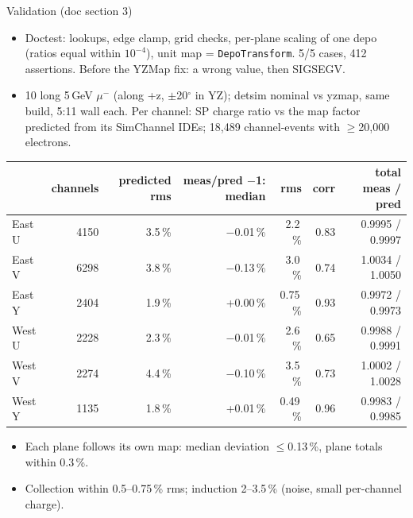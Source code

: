 \documentclass[aspectratio=169,10pt]{beamer}
\newcommand{\code}[1]{\texttt{#1}}
\begin{document}
\begin{frame}{Validation (doc section 3)}
\small
\begin{itemize}
\item Doctest: lookups, edge clamp, grid checks, per-plane scaling of one depo (ratios equal within $10^{-4}$), unit map = \code{DepoTransform}. 5/5 cases, 412 assertions. Before the YZMap fix: a wrong value, then SIGSEGV.
\item 10 long 5\,GeV $\mu^-$ (along +z, $\pm$20$^\circ$ in YZ); detsim nominal vs yzmap, same build, 5:11 wall each. Per channel: SP charge ratio vs the map factor predicted from its SimChannel IDEs; 18,489 channel-events with $\ge$20,000 electrons.
\end{itemize}
\vspace{1mm}
\centering
\footnotesize
\begin{tabular}{@{}lrrrrrr@{}}
\toprule
 & channels & predicted rms & meas/pred $-$1: median & rms & corr & total meas / pred \\
\midrule
East U & 4150 & 3.5\,\% & $-$0.01\,\% & 2.2\,\% & 0.83 & 0.9995 / 0.9997 \\
East V & 6298 & 3.8\,\% & $-$0.13\,\% & 3.0\,\% & 0.74 & 1.0034 / 1.0050 \\
East Y & 2404 & 1.9\,\% & +0.00\,\% & 0.75\,\% & 0.93 & 0.9972 / 0.9973 \\
West U & 2228 & 2.3\,\% & $-$0.01\,\% & 2.6\,\% & 0.65 & 0.9988 / 0.9991 \\
West V & 2274 & 4.4\,\% & $-$0.10\,\% & 3.5\,\% & 0.73 & 1.0002 / 1.0028 \\
West Y & 1135 & 1.8\,\% & +0.01\,\% & 0.49\,\% & 0.96 & 0.9983 / 0.9985 \\
\bottomrule
\end{tabular}
\raggedright
\small
\begin{itemize}
\item Each plane follows its own map: median deviation $\le$0.13\,\%, plane totals within 0.3\,\%.
\item Collection within 0.5--0.75\,\% rms; induction 2--3.5\,\% (noise, small per-channel charge).
\end{itemize}
\end{frame}
\end{document}
